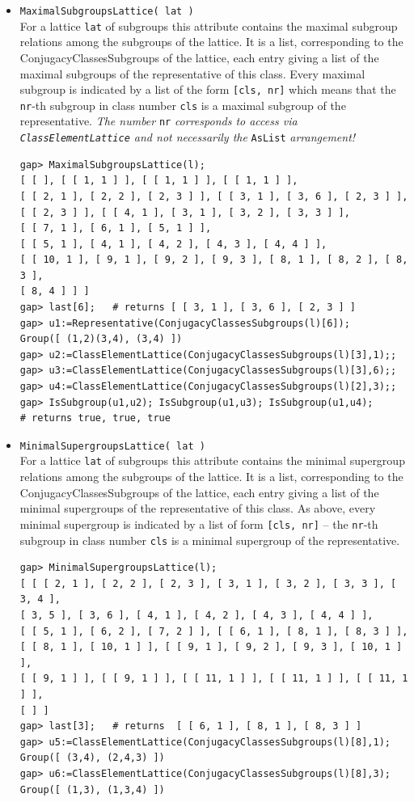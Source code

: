 \begin{itemize}
\item {\tt MaximalSubgroupsLattice( lat )}\\
For a lattice {\tt lat} of subgroups this attribute contains the maximal subgroup relations among the subgroups
of the lattice. It is a list, corresponding to the ConjugacyClassesSubgroups of the lattice, each entry giving
a list of the maximal subgroups of the representative of this class. Every maximal subgroup is indicated by
a list of the form {\tt [cls, nr]} which means that the {\tt nr}-th subgroup in class
number {\tt cls} is a maximal subgroup of the representative.
{\it The number} {\tt nr} {\it corresponds to access via {\tt ClassElementLattice} and not
necessarily the} {\tt AsList} {\it arrangement!}
{\codesize
\begin{verbatim}
gap> MaximalSubgroupsLattice(l);
[ [ ], [ [ 1, 1 ] ], [ [ 1, 1 ] ], [ [ 1, 1 ] ],
[ [ 2, 1 ], [ 2, 2 ], [ 2, 3 ] ], [ [ 3, 1 ], [ 3, 6 ], [ 2, 3 ] ],
[ [ 2, 3 ] ], [ [ 4, 1 ], [ 3, 1 ], [ 3, 2 ], [ 3, 3 ] ],
[ [ 7, 1 ], [ 6, 1 ], [ 5, 1 ] ],
[ [ 5, 1 ], [ 4, 1 ], [ 4, 2 ], [ 4, 3 ], [ 4, 4 ] ],
[ [ 10, 1 ], [ 9, 1 ], [ 9, 2 ], [ 9, 3 ], [ 8, 1 ], [ 8, 2 ], [ 8, 3 ],
[ 8, 4 ] ] ]
gap> last[6];   # returns [ [ 3, 1 ], [ 3, 6 ], [ 2, 3 ] ]
gap> u1:=Representative(ConjugacyClassesSubgroups(l)[6]);
Group([ (1,2)(3,4), (3,4) ])
gap> u2:=ClassElementLattice(ConjugacyClassesSubgroups(l)[3],1);;
gap> u3:=ClassElementLattice(ConjugacyClassesSubgroups(l)[3],6);;
gap> u4:=ClassElementLattice(ConjugacyClassesSubgroups(l)[2],3);;
gap> IsSubgroup(u1,u2); IsSubgroup(u1,u3); IsSubgroup(u1,u4);
# returns true, true, true
\end{verbatim}}
\item {\tt MinimalSupergroupsLattice( lat )}\\
For a lattice {\tt lat} of subgroups this attribute contains the minimal supergroup relations among the subgroups
of the lattice. It is a list, corresponding to the ConjugacyClassesSubgroups of the lattice, each entry giving
a list of the minimal supergroups of the representative of this class. As above, every minimal supergroup is indicated
by a list of form {\tt [cls, nr]} -- 
the {\tt nr}-th subgroup in class number {\tt cls} is a minimal supergroup of the representative.
{\codesize
\begin{verbatim}
gap> MinimalSupergroupsLattice(l);
[ [ [ 2, 1 ], [ 2, 2 ], [ 2, 3 ], [ 3, 1 ], [ 3, 2 ], [ 3, 3 ], [ 3, 4 ],
[ 3, 5 ], [ 3, 6 ], [ 4, 1 ], [ 4, 2 ], [ 4, 3 ], [ 4, 4 ] ],
[ [ 5, 1 ], [ 6, 2 ], [ 7, 2 ] ], [ [ 6, 1 ], [ 8, 1 ], [ 8, 3 ] ],
[ [ 8, 1 ], [ 10, 1 ] ], [ [ 9, 1 ], [ 9, 2 ], [ 9, 3 ], [ 10, 1 ] ],
[ [ 9, 1 ] ], [ [ 9, 1 ] ], [ [ 11, 1 ] ], [ [ 11, 1 ] ], [ [ 11, 1 ] ],
[ ] ]
gap> last[3];   # returns  [ [ 6, 1 ], [ 8, 1 ], [ 8, 3 ] ]
gap> u5:=ClassElementLattice(ConjugacyClassesSubgroups(l)[8],1);
Group([ (3,4), (2,4,3) ])
gap> u6:=ClassElementLattice(ConjugacyClassesSubgroups(l)[8],3);
Group([ (1,3), (1,3,4) ])
\end{verbatim}}
\end{itemize}

